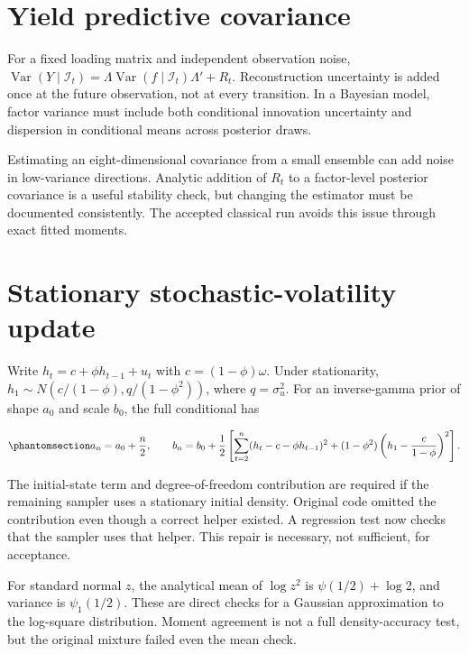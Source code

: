 \documentclass[
  12pt,
  letterpaper,
  DIV=11,
  numbers=noendperiod]{scrreprt}
\begin{document}
\section{Yield predictive covariance}\label{yield-predictive-covariance}

For a fixed loading matrix and independent observation noise,
\(\operatorname{Var}(Y\mid\mathcal I_t)=\Lambda\operatorname{Var}(f\mid\mathcal I_t)\Lambda'+R_t\).
Reconstruction uncertainty is added once at the future observation, not
at every transition. In a Bayesian model, factor variance must include
both conditional innovation uncertainty and dispersion in conditional
means across posterior draws.

Estimating an eight-dimensional covariance from a small ensemble can add
noise in low-variance directions. Analytic addition of \(R_t\) to a
factor-level posterior covariance is a useful stability check, but
changing the estimator must be documented consistently. The accepted
classical run avoids this issue through exact fitted moments.

\section{Stationary stochastic-volatility
update}\label{stationary-stochastic-volatility-update}

Write \(h_t=c+\phi h_{t-1}+u_t\) with \(c=(1-\phi)\omega\). Under
stationarity, \(h_1\sim N(c/(1-\phi),q/(1-\phi^2))\), where
\(q=\sigma_u^2\). For an inverse-gamma prior of shape \(a_0\) and scale
\(b_0\), the full conditional has

\begin{equation}\protect\phantomsection\label{eq-sv-update}{
a_n=a_0+\frac n2,\qquad
b_n=b_0+\frac12\left[\sum_{t=2}^n(h_t-c-\phi h_{t-1})^2
 +(1-\phi^2)\left(h_1-\frac{c}{1-\phi}\right)^2\right].
}\end{equation}

The initial-state term and degree-of-freedom contribution are required
if the remaining sampler uses a stationary initial density. Original
code omitted the contribution even though a correct helper existed. A
regression test now checks that the sampler uses that helper. This
repair is necessary, not sufficient, for acceptance.

For standard normal \(z\), the analytical mean of \(\log z^2\) is
\(\psi(1/2)+\log 2\), and variance is \(\psi_1(1/2)\). These are direct
checks for a Gaussian approximation to the log-square distribution.
Moment agreement is not a full density-accuracy test, but the original
mixture failed even the mean check.
\end{document}
